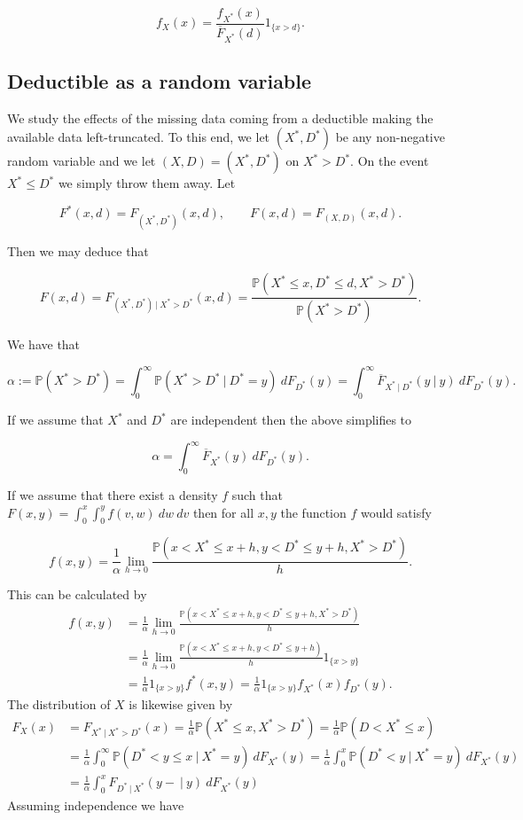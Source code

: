 \documentclass[a4paper,10pt,openany]{book}
\begin{document}
\[
f_X(x)=\frac{f_{X^*}(x)}{\overline F_{X^*}(d)}1_{\{x>d\}}.
\]

\hypertarget{deductible-as-a-random-variable}{%
\subsection{Deductible as a random variable}\label{deductible-as-a-random-variable}}

We study the effects of the missing data coming from a deductible making the available data left-truncated. To this end, we let \((X^*,D^*)\) be any non-negative random variable and we let \((X,D)=(X^*,D^*)\) on \(X^*>D^*\). On the event \(X^*\le D^*\) we simply throw them away. Let

\[
F^*(x,d)=F_{(X^*,D^*)}(x,d), \qquad F(x,d)= F_{(X,D)}(x,d).
\]

Then we may deduce that

\[
F(x,d)=F_{(X^*,D^*)\ \vert\ X^*>D^*}(x,d)=\frac{\mathbb P(X^*\le x, D^*\le d,X^*> D^*)}{\mathbb P(X^*> D^*)}.
\]

We have that

\[
\alpha:=\mathbb P(X^*> D^*)=\int_0^\infty \mathbb P(X^*>D^*\ \vert\ D^*=y)\ dF_{D^*}(y)=\int_0^\infty \overline F_{X^*\ \vert\ D^*}(y\ \vert\ y)\ dF_{D^*}(y).
\]

If we assume that \(X^*\) and \(D^*\) are independent then the above simplifies to

\[
\alpha =\int_0^\infty \overline F_{X^*}(y)\ dF_{D^*}(y).
\]

If we assume that there exist a density \(f\) such that \(F(x,y)=\int_0^x\int_0^y f(v,w)\ dw\ dv\) then for all \(x,y\) the function \(f\) would satisfy

\[
f(x,y)=\frac{1}{\alpha}\lim_{h\to 0}\frac{\mathbb P(x<X^*\le x+h, y<D^*\le y+h,X^*> D^*)}{h}.
\]

This can be calculated by
\begin{align*}
f(x,y)&=\frac{1}{\alpha}\lim_{h\to 0}\frac{\mathbb P(x<X^*\le x+h, y<D^*\le y+h,X^*> D^*)}{h}\\
&=\frac{1}{\alpha}\lim_{h\to 0}\frac{\mathbb P(x<X^*\le x+h, y<D^*\le y+h)}{h}1_{\{x>y\}}\\
&=\frac{1}{\alpha}1_{\{x>y\}}f^*(x,y)=\frac{1}{\alpha}1_{\{x>y\}}f_{X^*}(x)f_{D^*}(y).
\end{align*}
The distribution of \(X\) is likewise given by
\begin{align*}
F_X(x)&=F_{X^*\ \vert\ X^*>D^*}(x)=\frac{1}{\alpha}\mathbb P(X^*\le x,X^*>D^*)=\frac{1}{\alpha}\mathbb P(D<X^*\le x)\\
&=\frac{1}{\alpha}\int_0^\infty \mathbb P(D^*<y\le x\ \vert\ X^*=y)\ dF_{X^*}(y)=\frac{1}{\alpha}\int_0^x \mathbb P(D^*<y\ \vert\ X^*=y)\ dF_{X^*}(y)\\
&=\frac{1}{\alpha}\int_0^xF_{D^*\ \vert\ X^*}(y-\ \vert\ y)\ dF_{X^*}(y)
\end{align*}
Assuming independence we have
\end{document}
